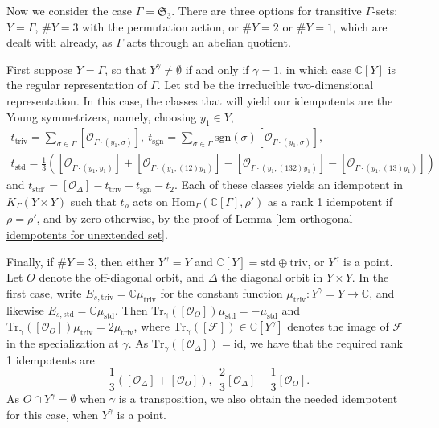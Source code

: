 \documentclass[10pt]{article}
\newcommand{\HomOver}[3]{\mathrm{Hom}_{#1}(#2, #3)}
\newcommand{\id}{\mathrm{id}}
\newcommand{\Ff}{\mathcal{F}}
\newcommand{\C}{\mathbb{C}}
\newcommand{\Oo}{\mathcal{O}}
\newcommand{\Sn}{\mathfrak{S}}
\newcommand{\triv}{\mathrm{triv}}
\newcommand{\sgn}{\mathrm{sgn}}
\theoremstyle{definition}
\theoremstyle{remark}
\newcommand{\std}{\mathrm{std}}
\begin{document}
Now we consider the case $\Gamma=\Sn_3$. There are three options for transitive $\Gamma$-sets: $Y=\Gamma$, $\#Y=3$ with the permutation action, or $\#Y=2$ or $\#Y=1$, which are dealt with already, as $\Gamma$ acts through an abelian quotient.

First suppose $Y=\Gamma$, so that $Y^\gamma\neq\emptyset$ if and only if $\gamma=1$, in which case $\C[Y]$ is the regular representation of $\Gamma$. Let $\std$ be the irreducible two-dimensional representation. In this case, the classes that will yield our idempotents are the Young symmetrizers, namely, choosing $y_1\in Y$,
%
\begin{multline*}
t_\triv=\sum_{\sigma\in\Gamma}[\Oo_{\Gamma\cdot(y_1,\sigma)}], ~ t_{\sgn}=\sum_{\sigma\in\Gamma}\sgn(\sigma)[\Oo_{\Gamma\cdot(y_1,\sigma)}],\\
t_{\std}=\frac{1}{3}\left([\Oo_{\Gamma\cdot(y_1,y_1)}]+[\Oo_{\Gamma\cdot(y_1,(12)y_1)}]-[\Oo_{\Gamma\cdot(y_1,(132)y_1)}]-[\Oo_{\Gamma\cdot(y_1,(13)y_1)}]\right)
\end{multline*}
%
and $t_{\std'}=[\Oo_{\Delta}]-t_\triv-t_\sgn-t_2$. Each of these classes yields an idempotent in $K_{\Gamma}(Y\times Y)$ such that $t_\rho$ acts on $\HomOver{\Gamma}{\C[\Gamma]}{\rho'}$ as a rank 1 idempotent if $\rho=\rho'$, and by zero otherwise, by the proof of Lemma \ref{lem orthogonal idempotents for unextended set}.

Finally, if $\#Y=3$, then either $Y^\gamma=Y$ and $\C[Y]=\std\oplus\triv$, or $Y^\gamma$ is a point. Let $O$ denote the off-diagonal orbit, and $\Delta$ the diagonal orbit in $Y\times Y$. In the first case, write $E_{s,\triv}=\C\mu_\triv$ for the constant function $\mu_\triv\colon Y^\gamma=Y\to\C$, and likewise $E_{s,\std}=\C\mu_{\std}$. Then $\mathrm{Tr_\gamma}([\Oo_O])\mu_{\std}=-\mu_{\std}$ and $\mathrm{Tr_\gamma}([\Oo_O])\mu_\triv=2\mu_\triv$, where $\mathrm{Tr_\gamma}([\Ff])\in\C[Y^\gamma]$ denotes the image of $\Ff$ in the specialization at $\gamma$. As $\mathrm{Tr}_\gamma([\Oo_\Delta])=\id$, we have that the required rank 1 idempotents are 
%
\[
\frac{1}{3}\left([\Oo_\Delta]+[\Oo_{O}]\right),~~\frac{2}{3}[\Oo_\Delta]-\frac{1}{3}[\Oo_O].
\]
%
As $O\cap Y^\gamma=\emptyset$ when $\gamma$ is a transposition, we also obtain the needed idempotent for this case, when $Y^\gamma$ is a point.
\end{document}
